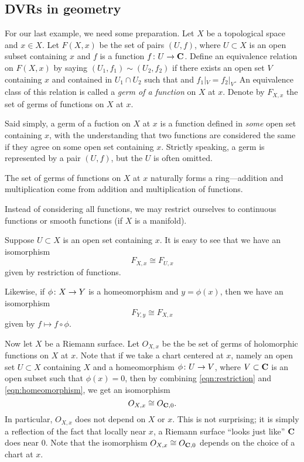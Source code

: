 \documentclass[12pt]{article}
\begin{document}
\subsection{DVRs in geometry}
For our last example, we need some preparation.
Let $X$ be a topological space and $x \in X$.
Let $F(X, x)$ be the set of pairs $(U, f)$, where $U \subset X$ is an open subset containing $x$ and $f$ is a function $f {\colon} U \to {\bf C}$.
Define an equivalence relation on $F(X, x)$ by saying $(U_1, f_1) \sim (U_2, f_2)$ if there exists an open set $V$ containing $x$ and contained in $U_1 \cap U_2$ such that and $f_1|_V = f_2|_V$.
An equivalence class of this relation is called a \emph{germ of a function} on $X$ at $x$.
Denote by $F_{X,x}$ the set of germs of functions on $X$ at $x$.

Said simply, a germ of a fuction on $X$ at $x$ is a function defined in \emph{some} open set containing $x$, with the understanding that two functions are considered the same if they agree on some open set containing $x$.
Strictly speaking, a germ is represented by a pair $(U, f)$, but the $U$ is often omitted.

The set of germs of functions on $X$ at $x$ naturally forms a ring---addition and multiplication come from addition and multiplication of functions.

Instead of considering all functions, we may restrict ourselves to continuous functions or smooth functions (if $X$ is a manifold).

Suppose $U \subset X$ is an open set containing $x$.
It is easy to see that we have an isomorphism
\begin{equation}\label{eqn:restriction}
  F_{X, x} \cong F_{U, x}
\end{equation}
given by restriction of functions.

Likewise, if $\phi {\colon} X \to Y$ is a homeomorphism and $y = \phi(x)$, then we have an isomorphism
\begin{equation}\label{eqn:homeomorphism}
  F_{Y, y} \cong F_{X, x}
\end{equation}
given by $f \mapsto f \circ \phi$.

Now let $X$ be a Riemann surface.
Let $O_{X,x}$ be the be set of germs of holomorphic functions on $X$ at $x$.
Note that if we take a chart centered at $x$, namely an open set $U \subset X$ containing $X$ and a homeomorphism $\phi {\colon} U \to V$, where $V \subset {\bf C}$ is an open subset such that $\phi(x) = 0$, then by combining \autoref{eqn:restriction} and \autoref{eqn:homeomorphism}, we get an isomorphism
\[ O_{X, x} \cong O_{{\bf C}, 0}.\]
In particular, $O_{X,x}$ does not depend on $X$ or $x$.
This is not surprising; it is simply a reflection of the fact that locally near $x$, a Riemann surface ``looks just like'' ${\bf C}$ does near $0$.
Note that the isomorphism $O_{X,x} \cong O_{{\bf C},0}$ depends on the choice of a chart at $x$.
\end{document}
